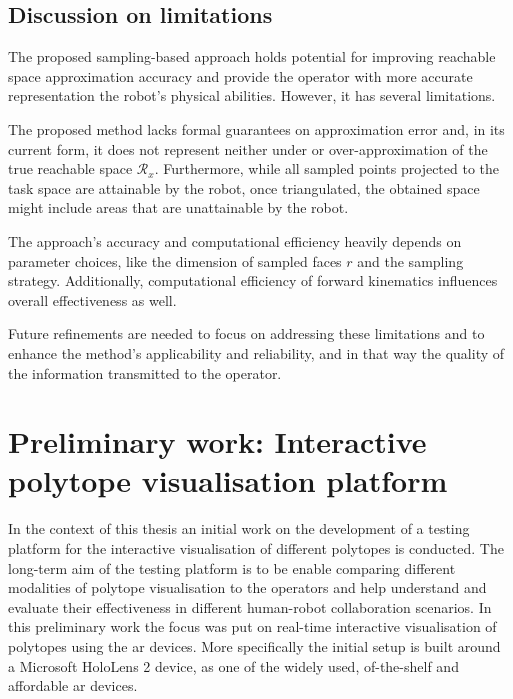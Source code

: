 \subsection{Discussion on limitations}

The proposed sampling-based approach holds potential for improving reachable space approximation accuracy and provide the operator with more accurate representation the robot's physical abilities. However, it has several limitations. 

The proposed method lacks formal guarantees on approximation error and, in its current form, it does not represent neither under or over-approximation of the true reachable space $\mathcal{R}_x$. Furthermore, while all sampled points projected to the task space are attainable by the robot, once triangulated, the obtained space might include areas that are unattainable by the robot.

The approach's accuracy and computational efficiency heavily depends on parameter choices, like the dimension of sampled faces $r$ and the sampling strategy. Additionally, computational efficiency of forward kinematics influences overall effectiveness as well. 

Future refinements are needed to focus on addressing these limitations and to enhance the method's applicability and reliability, and in that way the quality of the information transmitted to the operator.


\section{Preliminary work: Interactive polytope visualisation platform}
\label{ch:claire}


In the context of this thesis an initial work on the development of a testing platform for the interactive visualisation of different polytopes is conducted.
The long-term aim of the testing platform is to be enable comparing different modalities of polytope visualisation to the operators and help understand and evaluate their effectiveness in different human-robot collaboration scenarios. In this preliminary work the focus was put on real-time interactive visualisation of polytopes using the \gls{ar} devices. More specifically the initial setup is built around a Microsoft HoloLens 2 device, as one of the widely used, of-the-shelf and affordable \gls{ar} devices.



